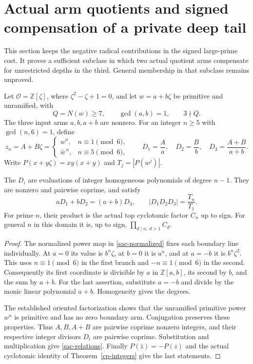 \section{Actual arm quotients and signed compensation of a private deep tail}
\label{sac-section}

This section keeps the negative radical contributions in the signed
large-prime cost. It proves a sufficient subclass in which two actual
quotient arms compensate for unrestricted depths in the third. General
membership in that subclass remains unproved.

Let $\mathcal O=\mathbb Z[\zeta]$, where $\zeta^2-\zeta+1=0$, and let
$w=a+b\zeta$ be primitive and unramified, with
\[
 Q=N(w)\ge7,\qquad \gcd(a,b)=1,\qquad 3\nmid Q.
\]
The three input arms $a,b,a+b$ are nonzero. For an integer $n\ge5$
with $\gcd(n,6)=1$, define
\begin{equation}\label{sac-normalized}
 z_n=A+B\zeta=
 \begin{cases}w^n,&n\equiv1\pmod6,\\
 \bar w^{\,n},&n\equiv5\pmod6,
 \end{cases}
 \qquad
 D_1=\frac A a,\quad D_2=\frac B b,\quad
 D_3=\frac{A+B}{a+b}.
\end{equation}
Write $P(x+y\zeta)=xy(x+y)$ and $T_j=|P(w^j)|$.

\begin{lemma}\label{sac-quotients}
The $D_i$ are evaluations of integer homogeneous polynomials of degree
$n-1$. They are nonzero and pairwise coprime, and satisfy
\begin{equation}\label{sac-relations}
 aD_1+bD_2=(a+b)D_3,\qquad
 |D_1D_2D_3|=\frac{T_n}{T_1}.
\end{equation}
For prime $n$, their product is the actual top cyclotomic factor $C_n$
up to sign. For general $n$ in this domain it is, up to sign,
$\prod_{d\mid n,\ d>1}C_d$.
\end{lemma}
\begin{proof}
The normalized power map in \eqref{sac-normalized} fixes each boundary
line individually. At $a=0$ its value is $b^n\zeta$, at $b=0$ it is
$a^n$, and at $a=-b$ it is $b^n\zeta^2$. This uses $n\equiv1\pmod6$
in the first branch and $-n\equiv1\pmod6$ in the second.
Consequently its first coordinate is divisible by $a$ in $\mathbb Z[a,b]$,
its second by $b$, and the sum by $a+b$. For the last assertion,
substitute $a=-b$ and divide by the monic linear polynomial $a+b$.
Homogeneity gives the degrees.

The established oriented factorization shows that the unramified
primitive power $w^n$ is primitive and has no zero boundary arm.
Conjugation preserves these properties. Thus $A,B,A+B$ are pairwise
coprime nonzero integers, and their respective integer divisors $D_i$
are pairwise coprime. Substitution and multiplication give
\eqref{sac-relations}. Finally $P(\bar z)=-P(z)$ and the actual
cyclotomic identity of Theorem~\ref{cp-integers} give the last statements.
\end{proof}

